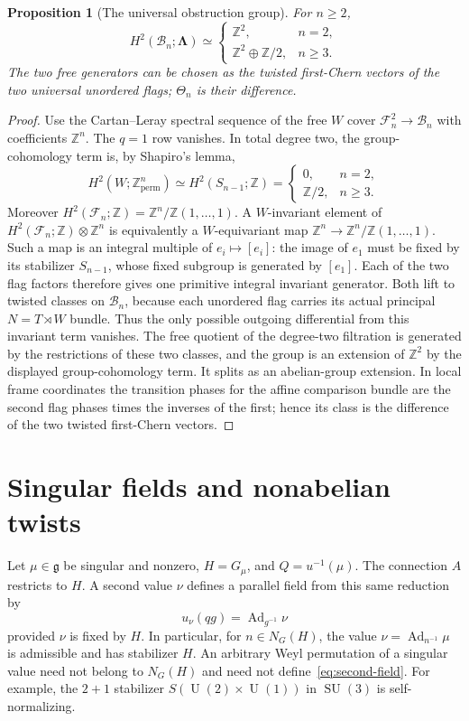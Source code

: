 \documentclass[11pt]{amsart}
\newcommand{\Ad}{\operatorname{Ad}}
\newcommand{\SU}{\operatorname{SU}}
\newcommand{\U}{\operatorname{U}}
\newcommand{\Z}{\mathbb Z}
\theoremstyle{plain}
\newtheorem{proposition}[theorem]{Proposition}
\theoremstyle{definition}
\theoremstyle{remark}
\begin{document}
\begin{proposition}[The universal obstruction group]
\label{prop:universal-obstruction}
For $n\geq2$,
\[
 H^2(\mathcal B_n;\boldsymbol\Lambda)\simeq
 \begin{cases}
 \Z^2,&n=2,\\
 \Z^2\oplus\Z/2,&n\geq3.
 \end{cases}
\]
The two free generators can be chosen as the twisted first-Chern
vectors of the two universal unordered flags; $\Theta_n$ is their
difference.
\end{proposition}

\begin{proof}
Use the Cartan--Leray spectral sequence of the free $W$ cover
$\mathcal F_n^2\to\mathcal B_n$ with coefficients $\Z^n$.
The $q=1$ row vanishes. In total degree two, the group-cohomology term
is, by Shapiro's lemma,
\[
 H^2(W;\Z^n_{\mathrm{perm}})
 \simeq H^2(S_{n-1};\Z)
 =\begin{cases}0,&n=2,\\\Z/2,&n\geq3.\end{cases}
\]
Moreover $H^2(\mathcal F_n;\Z)=\Z^n/\Z(1,\ldots,1)$.
A $W$-invariant element of
$H^2(\mathcal F_n;\Z)\otimes\Z^n$
is equivalently a $W$-equivariant map
$\Z^n\to\Z^n/\Z(1,\ldots,1)$. Such a map is an integral multiple
of $e_i\mapsto[e_i]$: the image of $e_1$ must be fixed by its
stabilizer $S_{n-1}$, whose fixed subgroup is generated by $[e_1]$.
Each of the two flag factors therefore gives one primitive integral
invariant generator. Both lift to twisted classes on $\mathcal B_n$, because
each unordered flag carries its actual principal $N=T\rtimes W$
bundle. Thus the only possible outgoing differential from this
invariant term vanishes. The free quotient of the degree-two filtration
is generated by the restrictions of these two classes, and the group is an extension
of $\Z^2$ by the displayed group-cohomology term. It splits as an
abelian-group extension. In local frame coordinates the transition
phases for the affine comparison bundle are the second flag phases
times the inverses of the first; hence its class is the difference of
the two twisted first-Chern vectors.
\end{proof}

\section{Singular fields and nonabelian twists}

Let $\mu\in\mathfrak g$ be singular and nonzero, $H=G_\mu$, and $Q=u^{-1}(\mu)$. The connection $A$ restricts to $H$. A second value $\nu$ defines a parallel field from this same reduction by
\begin{equation}\label{eq:second-field}
 u_\nu(qg)=\Ad_{g^{-1}}\nu
\end{equation}
provided $\nu$ is fixed by $H$. In particular, for $n\in N_G(H)$, the value $\nu=\Ad_{n^{-1}}\mu$ is admissible and has stabilizer $H$. An arbitrary Weyl permutation of a singular value need not belong to $N_G(H)$ and need not define~\eqref{eq:second-field}. For example, the $2+1$ stabilizer $S(\U(2)\times\U(1))$ in $\SU(3)$ is self-normalizing.
\end{document}
